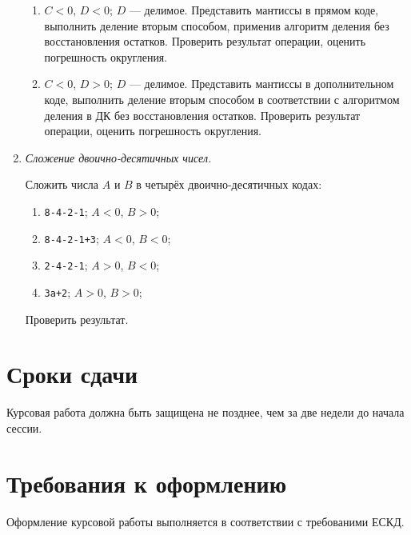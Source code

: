 \begin{enumerate}
\begin{enumerate}
        \item $C<0$, $D<0$; $D$ --- делимое. Представить мантиссы в прямом коде, выполнить деление вторым способом, применив алгоритм деления без восстановления остатков. Проверить результат операции, оценить погрешность округления.
        
        \item $C<0$, $D>0$; $D$ --- делимое. Представить мантиссы в дополнительном коде, выполнить деление вторым способом в соответствии с алгоритмом деления в ДК без восстановления остатков. Проверить результат операции, оценить погрешность округления.
    \end{enumerate}
    
    \item \emph{Сложение двоично-десятичных чисел.}
 	
    Сложить числа $A$ и $B$ в четырёх двоично-десятичных кодах: 
    \begin{enumerate}
        \item \texttt{8-4-2-1}; $A<0$, $B>0$;
        \item \texttt{8-4-2-1+3}; $A<0$, $B<0$;
        \item \texttt{2-4-2-1}; $A>0$, $B<0$;
        \item \texttt{3а+2}; $A>0$, $B>0$;
    \end{enumerate}
    Проверить результат. 	
\end{enumerate}


\section{Сроки сдачи}

Курсовая работа должна быть защищена не позднее, чем за две недели до начала сессии.

\section{Требования к оформлению}

Оформление курсовой работы выполняется в соответствии с требованими ЕСКД.
